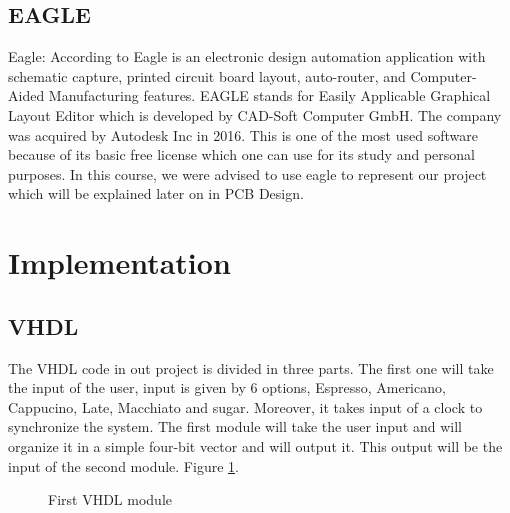 \documentclass[12pt]{article}
\begin{document}
\subsection{EAGLE}

Eagle: According to \cite{eagle} Eagle is an electronic design automation application with schematic capture, printed circuit board layout, auto-router, and Computer-Aided Manufacturing features. EAGLE stands for Easily Applicable Graphical Layout Editor which is developed by CAD-Soft Computer GmbH. The company was acquired by Autodesk Inc in 2016. This is one of the most used software because of its basic free license which one can use for its study and personal purposes. In this course, we were advised to use eagle to represent our project which will be explained later on in PCB Design.

\section{Implementation}

\subsection{VHDL}

The VHDL code in out project is divided in three parts. The first one will take the input of the user, input is given by 6 options, Espresso, Americano, Cappucino, Late, Macchiato and sugar. Moreover, it takes input of a clock to synchronize the system. The first module will take the user input and will organize it in a simple four-bit vector and will output it. This output will be the input of the second module. Figure \ref{fig:vhdl1}.

\begin{figure}[H]
\caption{First VHDL module}
\label{fig:vhdl1}
\end{figure}
\end{document}
